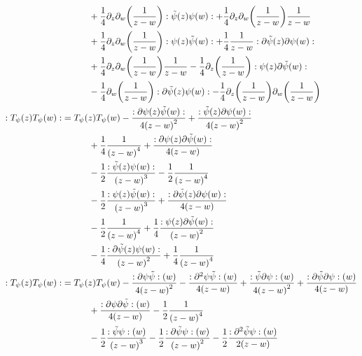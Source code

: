 \begin{align*}
    &\quad\quad\quad+\frac14\partial_z\partial_w\qty(\frac{1}{z-w})\cnord{\tilde\psi\qty(z)\psi\qty(w)}+\frac14\partial_z\partial_w\qty(\frac{1}{z-w})\frac{1}{z-w}\\
    &\quad\quad\quad+\frac14\partial_z\partial_w\qty(\frac{1}{z-w})\cnord{\psi\qty(z)\tilde\psi\qty(w)}+\frac14\frac{1}{z-w}\cnord{\partial\tilde\psi\qty(z)\partial\psi\qty(w)}\\
    &\quad\quad\quad+\frac14\partial_z\partial_w\qty(\frac{1}{z-w})\frac{1}{z-w}-\frac14\partial_z\qty(\frac{1}{z-w})\cnord{\psi\qty(z)\partial\tilde\psi\qty(w)}\\
    &\quad\quad\quad-\frac14\partial_w\qty(\frac{1}{z-w})\cnord{\partial\tilde\psi\qty(z)\psi\qty(w)}-\frac14\partial_z\qty(\frac{1}{z-w})\partial_w\qty(\frac{1}{z-w})\\
    \cnord{T_\psi\qty(z)T_\psi\qty(w)}&=T_\psi\qty(z)T_\psi\qty(w)-\frac{\cnord{\partial\psi\qty(z)\tilde\psi\qty(w)}}{4\qty(z-w)^2}+\frac{\cnord{\tilde\psi\qty(z)\partial\psi\qty(w)}}{4\qty(z-w)^2}\\
    &\quad\quad\quad+\frac14\frac{1}{\qty(z-w)^4}+\frac{\cnord{\partial\psi\qty(z)\partial\tilde\psi\qty(w)}}{4\qty(z-w)}\\
    &\quad\quad\quad-\frac12\frac{\cnord{\tilde\psi\qty(z)\psi\qty(w)}}{\qty(z-w)^3}-\frac12\frac{1}{\qty(z-w)^4}\\
    &\quad\quad\quad-\frac12\frac{\cnord{\psi\qty(z)\tilde\psi\qty(w)}}{\qty(z-w)^3}+\frac{\cnord{\partial\tilde\psi\qty(z)\partial\psi\qty(w)}}{4\qty(z-w)}\\
    &\quad\quad\quad-\frac12\frac{1}{\qty(z-w)^4}+\frac14\frac{\cnord{\psi\qty(z)\partial\tilde\psi\qty(w)}}{\qty(z-w)^2}\\
    &\quad\quad\quad-\frac14\frac{\cnord{\partial\tilde\psi\qty(z)\psi\qty(w)}}{\qty(z-w)^2}+\frac14\frac{1}{\qty(z-w)^4}\\
    \cnord{T_\psi\qty(z)T_\psi\qty(w)}&=T_\psi\qty(z)T_\psi\qty(w)-\frac{\cnord{\partial\psi\tilde\psi}\qty(w)}{4\qty(z-w)^2}-\frac{\cnord{\partial^2\psi\tilde\psi}\qty(w)}{4\qty(z-w)}+\frac{\cnord{\tilde\psi\partial\psi}\qty(w)}{4\qty(z-w)^2}+\frac{\cnord{\partial\tilde\psi\partial\psi}\qty(w)}{4\qty(z-w)}\\
    &\quad\quad\quad+\frac{\cnord{\partial\psi\partial\tilde\psi}\qty(w)}{4\qty(z-w)}-\frac12\frac{1}{\qty(z-w)^4}\\
    &\quad\quad\quad-\frac12\frac{\cnord{\tilde\psi\psi}\qty(w)}{\qty(z-w)^3}-\frac12\frac{\cnord{\partial\tilde\psi\psi}\qty(w)}{\qty(z-w)^2}-\frac12\frac{\cnord{\partial^2\tilde\psi\psi}\qty(w)}{2\qty(z-w)}\\

\end{align*}

